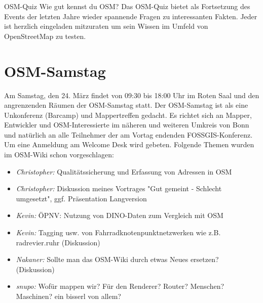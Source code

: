 %
{OSM-Quiz}%
{Wie gut kennst du OSM?}%
{Das OSM-Quiz bietet als Fortsetzung des Events der letzten Jahre wieder spannende Fragen zu
interessanten Fakten. Jeder ist herzlich eingeladen mitzuraten um sein Wissen im Umfeld von
OpenStreetMap zu testen.}


\vspace{-1.0\baselineskip}


\newpage
\section*{OSM-Samstag}
\pagestyle{cropmarksstyle}
\label{osm-samstag}
Am Samstag, den 24. März findet von 09:30 bis 18:00 Uhr im Roten Saal und den angrenzenden Räumen der OSM-Samstag statt.
Der OSM-Samstag ist als eine Unkonferenz (Barcamp) und Mappertreffen gedacht.
Es richtet sich an Mapper, Entwickler und OSM-Interessierte im näheren und
weiteren Umkreis von Bonn und natürlich an alle Teilnehmer der am Vortag
endenden FOSSGIS-Konferenz. Um eine Anmeldung am Welcome Desk wird gebeten.
Folgende Themen wurden im OSM-Wiki schon vorgeschlagen:
\begin{itemize}
  \RaggedRight
  \setlength{\itemsep}{-1pt}
  \item \emph{Christopher:} Qualitätssicherung und Erfassung von Adressen in OSM
  \item \emph{Christopher:} Diskussion meines Vortrages "Gut gemeint - Schlecht umgesetzt", ggf. Präsentation Langversion 
  \item \emph{Kevin:} ÖPNV: Nutzung von DINO-Daten zum Vergleich mit OSM
  \item \emph{Kevin:} Tagging usw. von Fahrradknotenpunktnetzwerken wie z.B. radrevier.ruhr (Diskussion)
  \item \emph{Nakaner:} Sollte man das OSM-Wiki durch etwas Neues ersetzen? (Diskussion)
  \item \emph{snupo:} Wofür mappen wir? Für den Renderer? Router? Menschen? Maschinen? ein bisserl von allem?
\end{itemize}
\vfill
\justifying

\newpage
